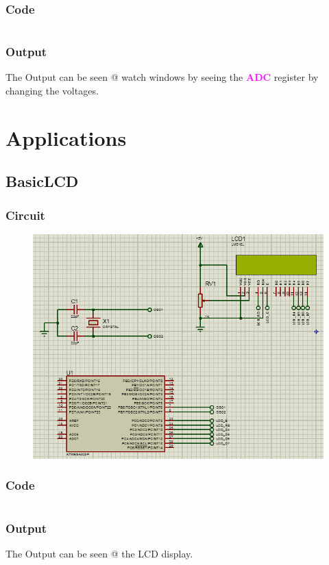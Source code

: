 \documentclass[oneside]{book}
\newcommand{\regFormat}[1]{\textbf{\textcolor{magenta}{#1}}}
\begin{document}
\subsection{Code}
\inputminted[bgcolor=black]{c}{../programFiles/AnalogToDigital.c}

\subsection{Output}
\quad The Output can be seen @ watch windows by seeing the \regFormat{ADC} register by changing the voltages.


\chapter{Applications}
\section{BasicLCD}
\subsection{Circuit}
\begin{figure}[H]
    \centering
    \includegraphics[height=0.2\textheight]{BasicLCD.png}
\end{figure}
\subsection{Code}
\inputminted[bgcolor=black]{c}{../programFiles/BasicLCD.c}

\subsection{Output}
\quad The Output can be seen @ the LCD display.
\end{document}

